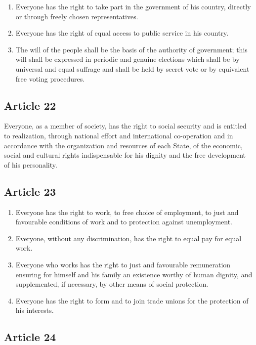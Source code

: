 \documentclass[
  ngerman,
  american,
  titlepage,
  openright,
  DIV=calc,
  toc=listof,
  listof=nochaptergap]{scrbook}
\begin{document}
\begin{enumerate}
\def\labelenumi{\arabic{enumi}.}
\item
  Everyone has the right to take part in the government of his country,
  directly or through freely chosen representatives.
\item
  Everyone has the right of equal access to public service in his
  country.
\item
  The will of the people shall be the basis of the authority of
  government; this will shall be expressed in periodic and genuine
  elections which shall be by universal and equal suffrage and shall be
  held by secret vote or by equivalent free voting procedures.
\end{enumerate}

\subsection{Article 22}\label{article-22-3}

Everyone, as a member of society, has the right to social security and
is entitled to realization, through national effort and international
co-operation and in accordance with the organization and resources of
each State, of the economic, social and cultural rights indispensable
for his dignity and the free development of his personality.

\subsection{Article 23}\label{article-23-3}

\begin{enumerate}
\def\labelenumi{\arabic{enumi}.}
\item
  Everyone has the right to work, to free choice of employment, to just
  and favourable conditions of work and to protection against
  unemployment.
\item
  Everyone, without any discrimination, has the right to equal pay for
  equal work.
\item
  Everyone who works has the right to just and favourable remuneration
  ensuring for himself and his family an existence worthy of human
  dignity, and supplemented, if necessary, by other means of social
  protection.
\item
  Everyone has the right to form and to join trade unions for the
  protection of his interests.
\end{enumerate}

\subsection{Article 24}\label{article-24-3}
\end{document}

